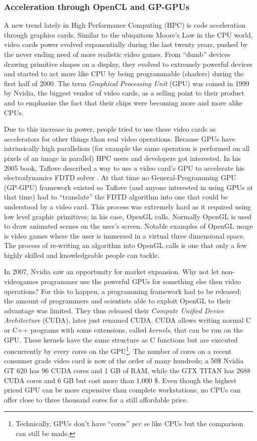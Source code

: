 \subsubsection{Acceleration through OpenCL and GP-GPUs}
A new trend lately in High Performance Computing (HPC) is code acceleration
through graphics cards. Similar to the ubiquitous Moore's Law in the CPU world,
video cards power evolved exponentially during the last twenty years, pushed
by the never ending need of more realistic video games. From ``dumb'' devices
drawing primitive shapes on a display, they evolved to extremely powerful
devices and started to act more like CPU by being programmable (shaders) during
the first half of 2000. The term \textit{Graphical Processing Unit} (GPU) was
coined in 1999 by Nvidia, the biggest vendor of video cards, as a selling point
to their product and to emphasize the fact that their chips were becoming more
and more alike CPUs.

Due to this increase in power, people tried to use these video cards as
accelerators for other things than real video operations. Because GPUs have
intrinsically high parallelism (for example the same operation is performed on
all pixels of an image in parallel) HPC users and developers got interested.
In his 2005 book, Taflove described a way to use a video card's GPU to
accelerate his electrodynamics FDTD solver \cite{Taflove2005}. At that time no
General-Programming GPU (GP-GPU) framework existed so Taflove (and anyone
interested in using GPUs at that time) had to ``translate'' the FDTD algorithm
into one that could be understood by a video card. This process was extremely
hard as it required using low level graphic primitives; in his case, OpenGL
calls. Normally OpenGL is used to draw animated scenes on the user's screen.
Notable examples of OpenGL usage is video games where the user is immersed in a
virtual three dimensional space. The process of re-writing an algorithm into
OpenGL calls is one that only a few highly skilled and knowledgeable people can
tackle.

In 2007, Nvidia saw an opportunity for market expansion. Why not let
non-videogames programmer use the powerful GPUs for something else then video
operations? For this to happen, a programming framework had to be released; the
amount of programmers and scientists able to exploit OpenGL to their advantage
was limited. They thus released their \textit{Compute Unified Device
Architecture} (CUDA), later just renamed CUDA. CUDA allows writing normal C or
C++ programs with some extensions, called \textit{kernels}, that can be run on
the GPU. These kernels have the same structure as C functions but are executed
concurrently by every cores on the GPU\footnote{Technically, GPUs don't have
``cores'' \textit{per se} like CPUs but the comparison can still be made.}. The
number of cores on a recent consumer grade video card is now of the order of
many hundreds; a 50\$ Nvidia GT 620 has 96 CUDA cores and 1 GB of RAM, while the
GTX TITAN has 2688 CUDA cores and 6 GB but cost more than 1,000 \$. Even though
the highest priced GPU can be more expensive than complete workstations, no CPUs
can offer close to three thousand cores for a still affordable price.

